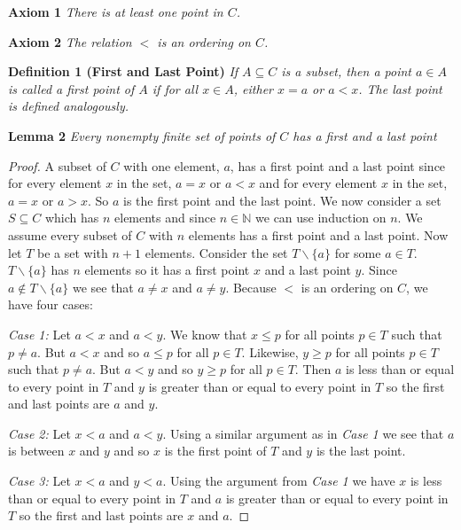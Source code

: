 \documentclass{article}
\begin{document}
\begin{flushleft}
\textbf{Axiom 1}
\textsl{There is at least one point in $C$.}\newline

\textbf{Axiom 2}
\textsl{The relation $<$ is an ordering on $C$.}\newline

\textbf{Definition 1 (First and Last Point)}
\textsl{If $A \subseteq C$ is a subset, then a point $a \in A$ is called a first point of $A$ if for all $x \in A$, either $x = a$ or $a < x$. The last point is defined analogously.}\newline

\textbf{Lemma 2}
\textsl{Every nonempty finite set of points of $C$ has a first and a last point}
\begin{proof}
A subset of $C$ with one element, $a$, has a first point and a last point since for every element $x$ in the set, $a=x$ or $a<x$ and for every element $x$ in the set, $a=x$ or $a>x$. So $a$ is the first point and the last point. We now consider a set $S \subseteq C$ which has $n$ elements and since $n \in \mathbb{N}$ we can use induction on $n$. We assume every subset of $C$ with $n$ elements has a first point and a last point. Now let $T$ be a set with $n+1$ elements. Consider the set $T \backslash \{a\}$ for some $a \in T$. $T \backslash \{a\}$ has $n$ elements so it has a first point $x$ and a last point $y$. Since $a \notin T \backslash \{a\}$ we see that $a \neq x$ and $a \neq y$. Because $<$ is an ordering on $C$, we have four cases:\newline

\textsl{Case 1:} Let $a<x$ and $a<y$. We know that $x \leq p$ for all points $p \in T$ such that $p \neq a$. But $a<x$ and so $a \leq p$ for all $p \in T$. Likewise, $y \geq p$ for all points $p \in T$ such that $p \neq a$. But $a<y$ and so $y \geq p$ for all $p \in T$. Then $a$ is less than or equal to every point in $T$ and $y$ is greater than or equal to every point in $T$ so the first and last points are $a$ and $y$.\newline

\textsl{Case 2:} Let $x<a$ and $a<y$. Using a similar argument as in \textit{Case 1} we see that $a$ is between $x$ and $y$ and so $x$ is the first point of $T$ and $y$ is the last point.\newline

\textsl{Case 3:} Let $x<a$ and $y<a$. Using the argument from \textit{Case 1} we have $x$ is less than or equal to every point in $T$ and $a$ is greater than or equal to every point in $T$ so the first and last points are $x$ and $a$.\newline


\end{proof}
\end{flushleft}
\end{document}
